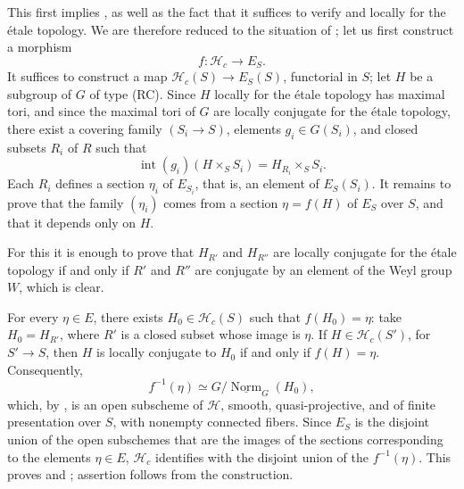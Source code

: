 This first implies \textup{}, as well as the fact that it
suffices to verify \textup{} and \textup{} locally for the
étale topology. We are therefore reduced to the situation of
\textup{}; let us first construct a morphism
\[
  f\colon\mathcal H_c\longrightarrow E_S.
\]
It suffices to construct a map
\(\mathcal H_c(S)\to E_S(S)\), functorial in \(S\); let \(H\) be a
subgroup of \(G\) of type \textup{(RC)}. Since \(H\) locally for
the étale topology has maximal tori, and since the maximal tori of
\(G\) are locally conjugate for the étale topology, there exist a
covering family \((S_i\to S)\), elements \(g_i\in G(S_i)\), and
closed subsets \(R_i\) of \(R\) such that
\[
  \operatorname{int}(g_i)(H\times_S S_i)
  =H_{R_i}\times_S S_i.
\]
Each \(R_i\) defines a section \(\eta_i\) of \(E_{S_i}\), that is,
an element of \(E_S(S_i)\). It remains to prove that the family
\((\eta_i)\) comes from a section \(\eta=f(H)\) of \(E_S\) over
\(S\), and that it depends only on \(H\).

For this it is enough to prove that \(H_{R'}\) and \(H_{R''}\) are
locally conjugate for the étale topology if and only if \(R'\) and
\(R''\) are conjugate by an element of the Weyl group \(W\), which
is clear.

For every \(\eta\in E\), there exists
\(H_0\in\mathcal H_c(S)\) such that \(f(H_0)=\eta\): take
\(H_0=H_{R'}\), where \(R'\) is a closed subset whose image is
\(\eta\). If \(H\in\mathcal H_c(S')\), for \(S'\to S\), then \(H\)
is locally conjugate to \(H_0\) if and only if \(f(H)=\eta\).
Consequently,
\[
  f^{-1}(\eta)\simeq
  G\big/\underline{\operatorname{Norm}}_G(H_0),
\]
which, by , is an open subscheme of \(\mathcal H\), smooth,
quasi-projective, and of finite presentation over \(S\), with
nonempty connected fibers. Since \(E_S\) is the disjoint union of
the open subschemes that are the images of the sections
corresponding to the elements \(\eta\in E\), \(\mathcal H_c\)
identifies with the disjoint union of the \(f^{-1}(\eta)\). This
proves \textup{} and \textup{}; assertion \textup{}
follows from the construction.

